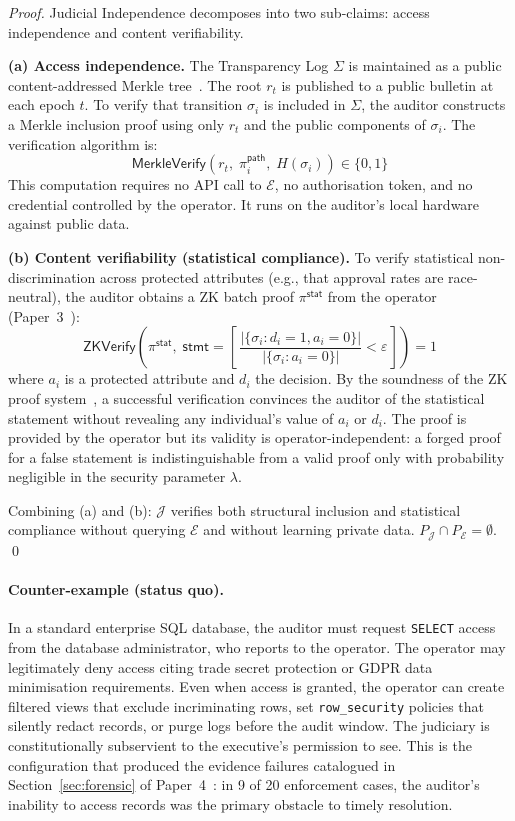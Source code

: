\begin{proof}
Judicial Independence decomposes into two sub-claims: access
independence and content verifiability.

\textbf{(a) Access independence.}
The Transparency Log $\Sigma$ is maintained as a public
content-addressed Merkle tree~\cite{btv-t-repo}. The root
$r_t$ is published to a public bulletin at each epoch $t$.
To verify that transition $\sigma_i$ is included in $\Sigma$,
the auditor constructs a Merkle inclusion proof using only
$r_t$ and the public components of $\sigma_i$. The verification
algorithm is:
\[
  \mathsf{MerkleVerify}(r_t,\; \pi^{\mathsf{path}}_i,\;
  H(\sigma_i)) \in \{0,1\}
\]
This computation requires no API call to $\mathcal{E}$, no
authorisation token, and no credential controlled by the operator.
It runs on the auditor's local hardware against public data.

\textbf{(b) Content verifiability (statistical compliance).}
To verify statistical non-discrimination across protected attributes
(e.g., that approval rates are race-neutral), the auditor
obtains a ZK batch proof $\pi^{\mathsf{stat}}$ from the operator
(Paper~3~\cite{btv-ar2026}):
\[
  \mathsf{ZKVerify}\!\left(
    \pi^{\mathsf{stat}},\;
    \mathsf{stmt} = \left[\,
      \frac{|\{\sigma_i : d_i = 1, a_i = 0\}|}
           {|\{\sigma_i : a_i = 0\}|} < \varepsilon
    \,\right]
  \right) = 1
\]
where $a_i$ is a protected attribute and $d_i$ the decision.
By the soundness of the ZK proof system~\cite{btv-ar2026}, a
successful verification convinces the auditor of the statistical
statement without revealing any individual's value of $a_i$ or $d_i$.
The proof is provided by the operator but its validity is
operator-independent: a forged proof for a false statement is
indistinguishable from a valid proof only with probability negligible
in the security parameter $\lambda$.

Combining (a) and (b): $\mathcal{J}$ verifies both structural inclusion
and statistical compliance without querying $\mathcal{E}$ and without
learning private data. $P_{\mathcal{J}} \cap P_{\mathcal{E}} =
\emptyset$. \qed
\end{proof}

\paragraph{Counter-example (status quo).}
In a standard enterprise SQL database, the auditor must request
\texttt{SELECT} access from the database administrator, who reports to
the operator. The operator may legitimately deny access citing trade
secret protection or GDPR data minimisation requirements. Even when
access is granted, the operator can create filtered views that exclude
incriminating rows, set \texttt{row\_security} policies that silently
redact records, or purge logs before the audit window. The judiciary
is constitutionally subservient to the executive's permission to see.
This is the configuration that produced the evidence failures catalogued
in Section~\ref{sec:forensic} of Paper~4~\cite{btv-econ}:
in 9 of 20 enforcement cases, the auditor's inability to access records
was the primary obstacle to timely resolution.

